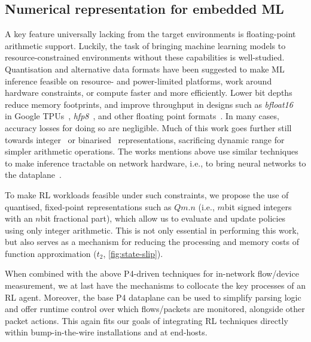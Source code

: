 \documentclass[sigconf,natbib=false]{acmart}
\begin{document}
\subsection{Numerical representation for embedded ML}
A key feature universally lacking from the target environments is floating-point arithmetic support.
Luckily, the task of bringing machine learning models to resource-constrained environments without these capabilities is well-studied.
Quantisation and alternative data formats have been suggested to make ML inference feasible on resource- and power-limited platforms, work around hardware constraints, or compute faster and more efficiently.
Lower bit depths reduce memory footprints, and improve throughput in designs such as \emph{bfloat16}~\parencite{bfloat16-blog} in Google TPUs~\parencite{DBLP:journals/sigops/XieDMKVZT18}, \emph{hfp8}~\parencite{DBLP:conf/nips/SunCCWVSCZG19}, and other floating point formats~\parencite{DBLP:journals/corr/abs-2007-01530}.
In many cases, accuracy losses for doing so are negligible.
Much of this work goes further still towards integer~\parencite{tensorrt-8bit} or binarised~\parencite{DBLP:journals/corr/MiyashitaLM16,DBLP:conf/eccv/RastegariORF16,DBLP:journals/corr/KimS16,DBLP:conf/nips/HubaraCSEB16} representations, sacrificing dynamic range for simpler arithmetic operations.
The works mentions above use similar techniques to make inference tractable on network hardware, i.e., to bring neural networks to the dataplane~\parencite{DBLP:journals/corr/abs-2009-02353,DBLP:conf/sigcomm/SanvitoSB18,DBLP:journals/corr/abs-1801-05731}.

To make RL workloads feasible under such constraints, we propose the use of quantised, fixed-point representations such as $Qm.n$ (i.e., $m$\si{bit} signed integers with an $n$\si{bit} fractional part), which allow us to evaluate and update policies using only integer arithmetic.
This is not only essential in performing this work, but also serves as a mechanism for reducing the processing and memory costs of function approximation ($t_2$, \cref{fig:state-slip}).

When combined with the above P4-driven techniques for in-network flow/device measurement, we at last have the mechanisms to collocate the key processes of an RL agent.
Moreover, the base P4 dataplane can be used to simplify parsing logic and offer runtime control over which flows/packets are monitored, alongside other packet actions.
This again fits our goals of integrating RL techniques directly within bump-in-the-wire installations and at end-hosts.
\end{document}
